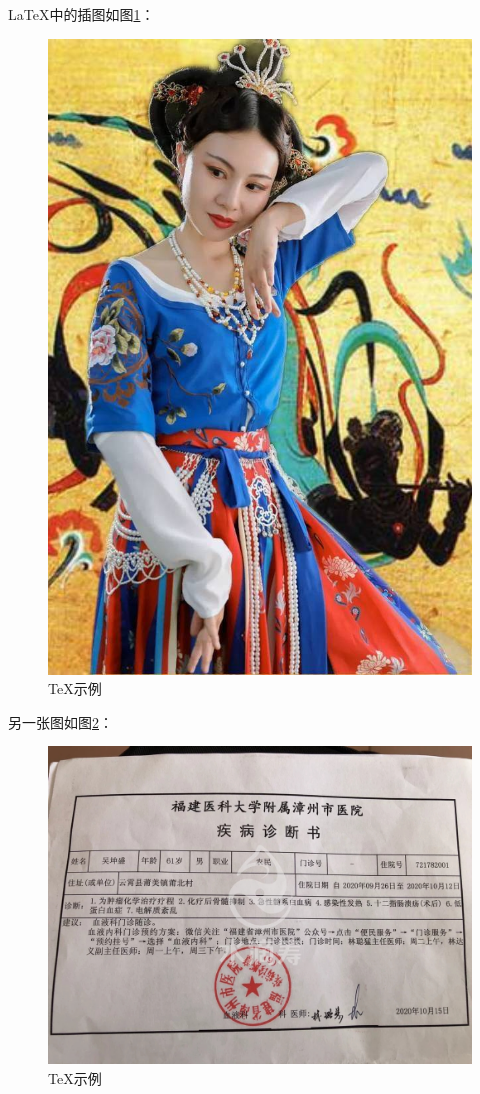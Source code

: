 \documentclass{article}
\begin{document}
	\LaTeX{}中的插图如图\ref{a}：
	
	\begin{figure}[htbp]
		\centering
		\includegraphics[scale=0.2]{11-21-1}
		\caption{\TeX 示例}
		\label{a}
	\end{figure}

	另一张图如图\ref{b}：
	
	\begin{figure}[htbp]
		\centering
		\includegraphics[scale=0.1]{11-22-1}
		\caption{\TeX 示例}
		\label{b}
	\end{figure}
	
\end{document}
